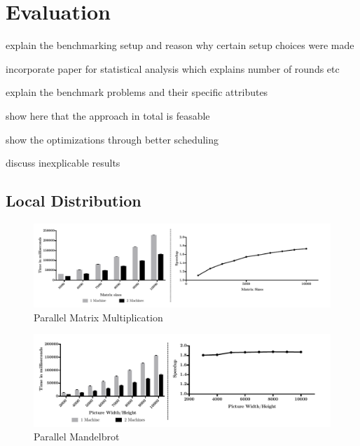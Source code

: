 \chapter{Evaluation}



explain the benchmarking setup and reason why certain setup choices were made

incorporate paper for statistical analysis which explains number of rounds etc

explain the benchmark problems and their specific attributes

show here that the approach in total is feasable

show the optimizations through better scheduling

discuss inexplicable results

\section{Local Distribution}

\begin{figure}[H]
	
	\includegraphics[width=1.0\textwidth]{images/sharded_matrix_multi.pdf}
	\centering
	\caption{Parallel Matrix Multiplication}
	\label{img:parallel_matrix}
\end{figure}


\begin{figure}[H]
	
	\includegraphics[width=1.0\textwidth]{images/sharded_mandelbrot.pdf}
	\centering
	\caption{Parallel Mandelbrot}
	\label{img:parallel_mandelbrot}
\end{figure}

